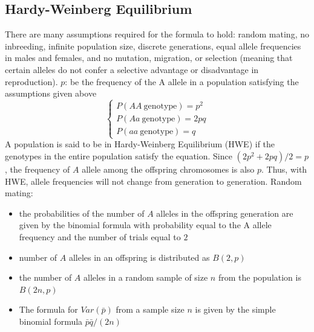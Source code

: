 \documentclass[a4paper,twoside,11pt]{article}
\begin{document}
\subsection{Hardy-Weinberg Equilibrium}
There are many assumptions required for the formula to hold: random mating, no inbreeding, infinite population size, discrete generations, equal allele frequencies in males and females, and no mutation, migration, or selection (meaning that certain alleles do not confer a selective advantage or disadvantage in reproduction).
\newline
\newline
\textcolor{NavyBlue}{$p$: }be the frequency of the A allele in a population satisfying the assumptions given above
$$
\begin{cases}
P(AA \ \text{genotype} ) = p^2 \\
P(Aa \ \text{genotype} ) = 2pq \\
P(aa \ \text{genotype} ) = q%
\end{cases}
$$
A population is said to be in Hardy-Weinberg Equilibrium (HWE) if the genotypes in the entire population satisfy the equation. Since $(2p^2 + 2pq)/2 = p$, the frequency of $A$ allele among the offspring chromosomes is also $p$. Thus, with HWE, allele frequencies will not change from generation to generation.
\newline
\newline
\textcolor{NavyBlue}{Random mating: }
\begin{itemize}
    \item  the probabilities of the number of $A$ alleles in the offspring generation are given by the binomial formula with probability equal to the A allele frequency and the number of trials equal to $2$
    \item number of $A$ alleles in an offspring is distributed as $B(2,p)$
    \item  the number of $A$ alleles in a random sample of size $n$ from the population is $B(2n,p)$
    \item The formula for $Var(\bar{p})$ from a sample size $n$ is given by the simple binomial formula $\bar{p}\bar{q}/(2n)$
\end{itemize}
\end{document}
